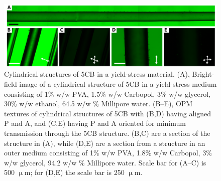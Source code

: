 \begin{figure}
  \centering
  \includegraphics{figures/C7/Ch7-Figs_CapStructures.png}
  \caption{Cylindrical structures of 5CB in a yield-stress material.
  (A), Bright-field image of a cylindrical structure of 5CB in a yield-stress medium consisting of 1\% w/w PVA, 1.5\% w/w Carbopol, 3\% w/w glycerol, 30\% w/w ethanol, 64.5 w/w \% Millipore water.
  (B--E), OPM textures of cylindrical structures of 5CB with (B,D) having aligned P and A, and (C,E) having P and A oriented for minimum transmission through the 5CB structure.
  (B,C) are a section of the structure in (A), while (D,E) are a section from a structure in an outer medium consisting of 1\% w/w PVA, 1.8\% w/w Carbopol, 3\% w/w glycerol, 94.2 w/w \% Millipore water.
  Scale bar for (A--C) is 500 $\upmu$m; for (D,E) the scale bar is 250 $\upmu$m.
  }\label{f:7-CapStructure}
\end{figure}

